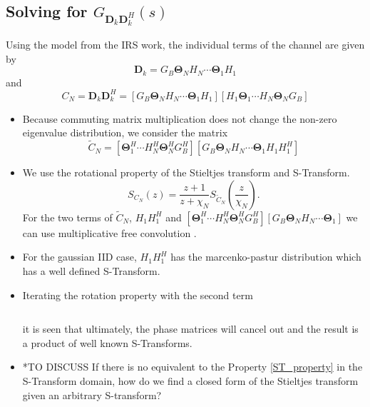 \documentclass[12pt,a4paper]{article}
\begin{document}
\subsection{Solving for $G_{\mathbf{D}_{k}\mathbf{D}_{k}^H}(s)$}\label{Polynomial_terms}
Using the model from the IRS work, the individual terms of the channel are given by
\begin{equation}
\mathbf{D}_{k} = G_B \boldsymbol{\Theta}_N H_N \cdots \boldsymbol{\Theta}_1 H_1
\end{equation}
and 
\begin{equation}
C_N = \mathbf{D}_{k}\mathbf{D}_{k}^H = [G_B \boldsymbol{\Theta}_N H_N \cdots \boldsymbol{\Theta}_1 H_1]
[H_1 \boldsymbol{\Theta}_1 \cdots H_N \boldsymbol{\Theta}_N G_B]
\end{equation}
\begin{itemize}
\item 
	Because commuting matrix multiplication does not change the non-zero eigenvalue distribution, we consider 
	the matrix 
\begin{equation}
\tilde{C}_N = [\boldsymbol{\Theta}_1^H \cdots H_N^H \boldsymbol{\Theta}_N^H G_B^H][G_B \boldsymbol{\Theta}_N H_N \cdots \boldsymbol{\Theta}_1 H_1 H_1^H]
\end{equation}

\item 
	We use the rotational property of the Stieltjes transform and S-Transform. 
\begin{equation}
S_{C_N}(z) = \frac{z+1}{z+\chi_N} S_{\tilde{C}_N}(\frac{z}{\chi_N}).
\end{equation}
For the two terms of $\tilde{C}_N$, 
$ H_1 H_1^H$ and $[\boldsymbol{\Theta}_1^H \cdots H_N^H \boldsymbol{\Theta}_N^H G_B^H][G_B \boldsymbol{\Theta}_N H_N \cdots \boldsymbol{\Theta}_1]$
we can use multiplicative free convolution .

\item
	For the gaussian IID case, $ H_1 H_1^H$  has the marcenko-pastur distribution which has a well defined S-Transform. 

\item 
	Iterating the rotation property with the second term 
	\begin{equation}
	[\boldsymbol{\Theta}_1^H H_2 \cdots H_N^H \boldsymbol{\Theta}_N^H G_B^H]
	[G_B \boldsymbol{\Theta}_N H_N  \cdots H_2^H \boldsymbol{\Theta}_1]
	\end{equation}
	
	\begin{equation}
	[ \boldsymbol{\Theta}_N H_N  \cdots H_2^H \boldsymbol{\Theta}_1]
	[\boldsymbol{\Theta}_1^H H_2 \cdots H_N^H \boldsymbol{\Theta}_N^H G_B^H G_B]
	\end{equation}
	
	 it is seen that ultimately, the phase matrices will cancel out and the result is a product of well known S-Transforms.


\item 
*TO DISCUSS If there is no equivalent to the Property \ref{ST_property} in the S-Transform domain, how do we 
find a closed form of the Stieltjes transform given an arbitrary S-transform?
\end{itemize}



\end{document}
